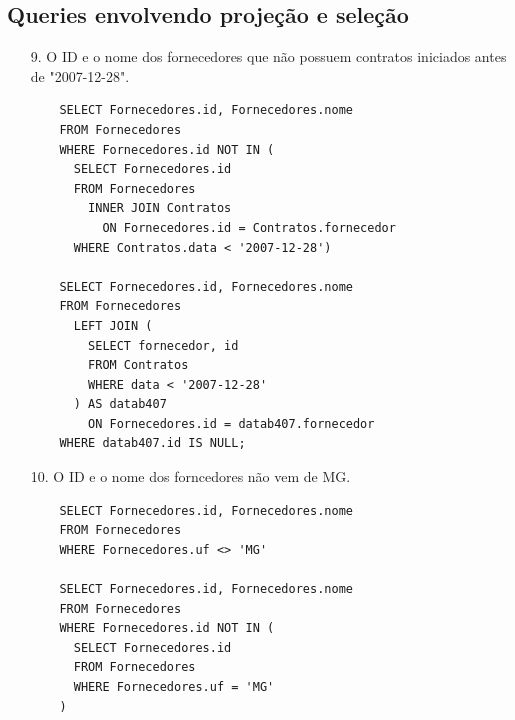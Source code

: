\documentclass{article}
\begin{document}
\subsection{Queries envolvendo projeção e seleção}
\begin{itemize}
\item[9.] O ID e o nome dos fornecedores que não possuem contratos iniciados antes de "2007-12-28".
  \begin{verbatim}
    SELECT Fornecedores.id, Fornecedores.nome
    FROM Fornecedores
    WHERE Fornecedores.id NOT IN (
      SELECT Fornecedores.id
      FROM Fornecedores
        INNER JOIN Contratos
          ON Fornecedores.id = Contratos.fornecedor
      WHERE Contratos.data < '2007-12-28')
      
    SELECT Fornecedores.id, Fornecedores.nome
    FROM Fornecedores
      LEFT JOIN (
        SELECT fornecedor, id
        FROM Contratos
        WHERE data < '2007-12-28'
      ) AS datab407
        ON Fornecedores.id = datab407.fornecedor 
    WHERE datab407.id IS NULL;
    \end{verbatim}
\item[10.] O ID e o nome dos forncedores não vem de MG.
  \begin{verbatim}
    SELECT Fornecedores.id, Fornecedores.nome
    FROM Fornecedores
    WHERE Fornecedores.uf <> 'MG'

    SELECT Fornecedores.id, Fornecedores.nome
    FROM Fornecedores
    WHERE Fornecedores.id NOT IN (
      SELECT Fornecedores.id
      FROM Fornecedores
      WHERE Fornecedores.uf = 'MG'
    )

    \end{verbatim}
\end{itemize}

\pagebreak
\end{document}

